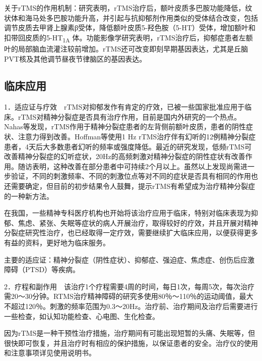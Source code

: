 关于rTMS的作用机制：研究表明，rTMS治疗后，额叶皮质多巴胺功能降低，纹状体和海马处多巴胺功能升高，并引起与抗抑郁剂作用类似的受体结合改变，包括调节皮质去甲肾上腺素β受体，降低额叶皮质5-羟色胺（5-HT）受体，增加额叶和扣带回皮质的5-HT\textsubscript{1A}
体。功能影像学研究表明，rTMS治疗后，抑郁症患者左额叶的局部脑血流灌注较前增加。rTMS还可改变即刻早期基因表达，尤其是丘脑PVT核及其他调节昼夜节律脑区的基因表达。

\subsection{临床应用}

1．适应证与疗效　rTMS对抑郁发作有肯定的疗效，已被一些国家批准应用于临床。rTMS对精神分裂症是否具有治疗作用，目前是国内外研究的一个热点。Nahas等发现，rTMS作用于精神分裂症患者的左背侧前额叶皮质，患者的阴性症状、注意力得到改善。Hoffman等使用1
Hz
rTMS治疗伴有幻听的12例精神分裂症患者，4天后大多数患者幻听的频率或强度降低。最近的研究发现，低频rTMS可改善精神分裂症的幻听症状，20Hz的高频刺激对精神分裂症的阴性症状有改善作用。随访表明，这种改善在部分患者中可持续2个月以上。虽然以上发现尚需进一步验证，不同的刺激频率、不同的刺激位点等对不同的症状是否具有相同的作用也还需要确定，但目前的初步结果令人鼓舞，提示rTMS有希望成为治疗精神分裂症的一种新方法。

在我国，一些精神专科医疗机构也开始将该治疗应用于临床，特别对临床表现为抑郁、焦虑、紧张、失眠等症状的病人开展治疗，取得较好的疗效，并且开展对精神分裂症研究性治疗，也已经取得一定疗效，需要继续扩大临床应用，以便获得更多有益的资料，更好地为临床服务。

主要的适应证：精神分裂症（阴性症状）、抑郁症、强迫症、焦虑症、创伤后应激障碍（PTSD）等疾病。

2．疗程和副作用　该治疗1个疗程需要4周的时间，每日1次，每周5次，每次治疗需20～30分钟。RTMS治疗精神障碍的研究多使用80％～110％的运动阈值，最大不超过120％。刺激的频率范围为0.3～20Hz。治疗前、治疗期间及治疗后需要进行一些检查，如认知功能检查、心电图、生化检查。

因为rTMS是一种干预性治疗措施，治疗期间有可能出现短暂的头痛、失眠等，但很快即可恢复，并且治疗时有相应的保护措施，以保证患者的安全。治疗仪的使用和注意事项详见使用说明书。


\protect\hypertarget{text00023.html}{}{}

